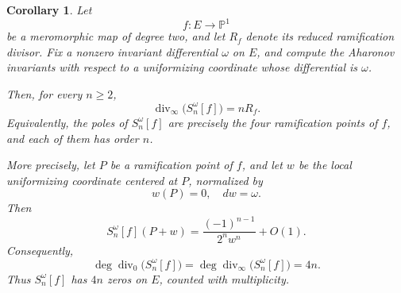 \documentclass[11pt]{amsart}
\newtheorem{cor}[thm]{Corollary}
\theoremstyle{definition}
\theoremstyle{remark}
\numberwithin{equation}{section}
\begin{document}
\begin{cor}\label{cor:poles-ramification}
Let
\[
f:E\longrightarrow \mathbb P^1
\]
be a meromorphic map of degree two, and let \(R_f\) denote its reduced
ramification divisor. Fix a nonzero invariant differential \(\omega\) on
\(E\), and compute the Aharonov invariants with respect to a uniformizing
coordinate whose differential is \(\omega\).

Then, for every \(n\geq2\),
\[
\operatorname{div}_{\infty}\bigl(S_n^\omega[f]\bigr)=nR_f.
\]
Equivalently, the poles of \(S_n^\omega[f]\) are precisely the four
ramification points of \(f\), and each of them has order \(n\).

More precisely, let \(P\) be a ramification point of \(f\), and let \(w\)
be the local uniformizing coordinate centered at \(P\), normalized by
\[
w(P)=0,
\quad
dw=\omega.
\]
Then
\begin{equation}\label{eq:principal-part}
S_n^\omega[f](P+w)
=
\frac{(-1)^{n-1}}{2^n w^n}
+
O(1).
\end{equation}
Consequently,
\[
\deg \operatorname{div}_{0}\bigl(S_n^\omega[f]\bigr)
=
\deg \operatorname{div}_{\infty}\bigl(S_n^\omega[f]\bigr)
=
4n.
\]
Thus \(S_n^\omega[f]\) has \(4n\) zeros on \(E\), counted with
multiplicity.
\end{cor}
\end{document}
